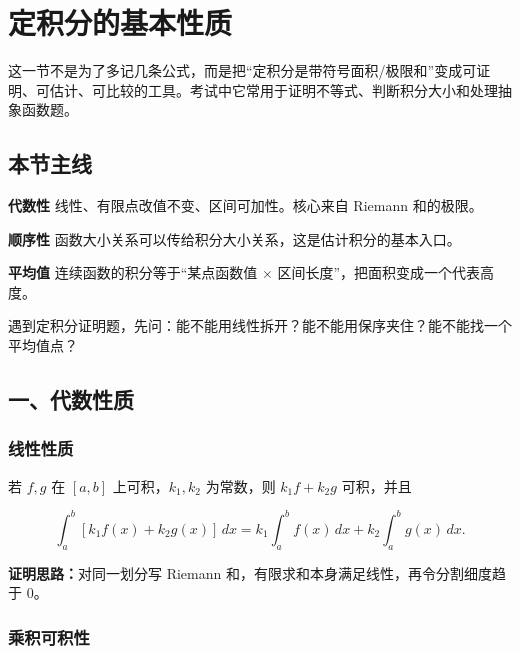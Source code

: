 \section{定积分的基本性质}

这一节不是为了多记几条公式，而是把“定积分是带符号面积/极限和”变成可证明、可估计、可比较的工具。考试中它常用于证明不等式、判断积分大小和处理抽象函数题。

\subsection*{本节主线}

\begin{conceptbox}
\textbf{代数性}
线性、有限点改值不变、区间可加性。核心来自 Riemann 和的极限。
\end{conceptbox}

\begin{conceptbox}
\textbf{顺序性}
函数大小关系可以传给积分大小关系，这是估计积分的基本入口。
\end{conceptbox}

\begin{conceptbox}
\textbf{平均值}
连续函数的积分等于“某点函数值 \(\times\) 区间长度”，把面积变成一个代表高度。
\end{conceptbox}

\begin{notebox}
遇到定积分证明题，先问：能不能用线性拆开？能不能用保序夹住？能不能找一个平均值点？
\end{notebox}

\subsection*{一、代数性质}

\subsubsection*{线性性质}

若 \(f,g\) 在 \([a,b]\) 上可积，\(k_1,k_2\) 为常数，则 \(k_1f+k_2g\) 可积，并且

\[
      \int_a^b [k_1f(x)+k_2g(x)]\,dx
      =
      k_1\int_a^b f(x)\,dx+k_2\int_a^b g(x)\,dx.
    \]

\textbf{证明思路：}对同一划分写 Riemann 和，有限求和本身满足线性，再令分割细度趋于 \(0\)。

\subsubsection*{乘积可积性}

